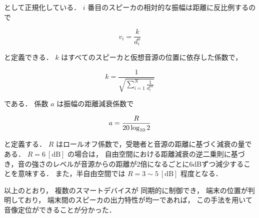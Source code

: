 として正規化している．
$i$ 番目のスピーカの相対的な振幅は距離に反比例するので

$$
v_i = \frac{k}{d_i^a}
$$

と定義できる．
$k$ はすべてのスピーカと仮想音源の位置に依存した係数で，

$$
k = \frac{1}{\sqrt{\sum_{i=1}^N \frac{1}{d_i^{2a}}}}
$$

である．
係数 $a$ は振幅の距離減衰係数で

$$
a = \frac{R}{20 \log_{10}2} \\
$$

と定義する．
$R$ はロールオフ係数で，受聴者と音源の距離に基づく減衰の量である．
$R=6\ [\mathrm{dB}]$ の場合は，
自由空間における距離減衰の逆二乗則に基づき，音の強さのレベルが音源からの距離が2倍になるごとに6dBずつ減少することを意味する．
また，半自由空間では $R=3\sim5\ [\mathrm{dB}]$ 程度となる．

以上のとおり，
複数のスマートデバイスが
同期的に制御でき，
端末の位置が判明しており，
端末間のスピーカの出力特性が均一であれば，
この手法を用いて音像定位ができることが分かった．
